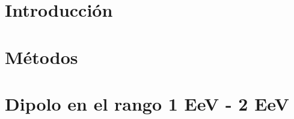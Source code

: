 \documentclass{ibtesis}
\begin{document}
\chapter{Introducción}
\graphicspath{{0_Introduccion/}}



\chapter{Métodos}
\graphicspath{{1_Metodo/}}



% 


% 

\chapter{Dipolo en el rango 1 EeV - 2 EeV}
\graphicspath{{6_Dipole_1-2_EeV/}}




% 


\begin{biblio}
	
\end{biblio}
\end{document}
